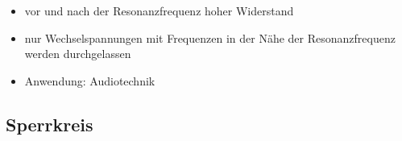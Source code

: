 \begin{frame}
\begin{center}
\begin{columns}
\begin{figure}
      \end{figure}
    \end{columns}
  \end{center}
  \pause
  \begin{itemize}
    \item vor und nach der Resonanzfrequenz hoher Widerstand
    \item nur Wechselspannungen mit Frequenzen in der Nähe der Resonanzfrequenz werden durchgelassen
    \item Anwendung: Audiotechnik
  \end{itemize}
\end{frame}

\subsection*{Sperrkreis}
